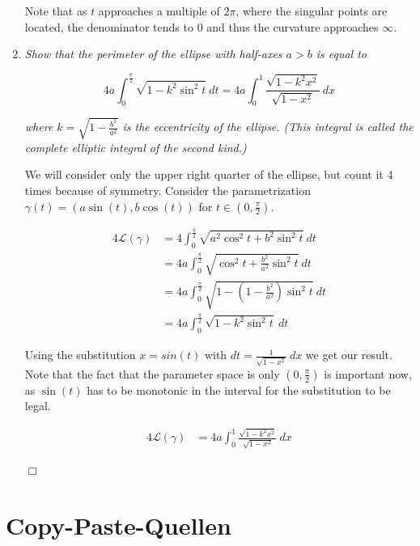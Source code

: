 \documentclass[a4paper,11pt,notitlepage,fullpage]{paper}
\theoremstyle{plain}
\theoremstyle{definition}
\begin{document}
\begin{enumerate}
Note that as $t$ approaches a multiple of $2\pi$, where the singular points are located, the denominator tends to $0$ and thus the curvature approaches $\infty$.



\item \emph{Show that the perimeter of the ellipse with half-axes $a>b$ is equal to }

\begin{equation*}
4a \int_0^\frac{\pi}{2} \sqrt{1 - k^2 \sin^2t} ~dt = 4a \int_0^1 \frac{\sqrt{1 - k^2 x^2}}{\sqrt{1 - x^2}} ~dx
\end{equation*}

\emph{where $k = \sqrt{1 - \frac{b^2}{a^2}}$ is the eccentricity of the ellipse. (This integral is called the complete elliptic integral of the second kind.)}

We will consider only the upper right quarter of the ellipse, but count it 4 times because of symmetry. Consider the parametrization $\gamma(t) = (a \sin(t), b \cos(t))$ for $t \in (0, \frac{\pi}{2})$.

\begin{align*}
4 \mathcal L(\gamma) &= 4 \int_0^\frac{\pi}{2} \sqrt{a^2 \cos^2t + b^2\sin^2t} ~dt \\
&= 4a \int_0^\frac{\pi}{2} \sqrt{\cos^2t + \frac{b^2}{a^2}\sin^2t} ~dt \\
&= 4a \int_0^\frac{\pi}{2} \sqrt{1 - \left(1 - \frac{b^2}{a^2}\right)\sin^2t} ~dt \\
&= 4a \int_0^\frac{\pi}{2} \sqrt{1 - k^2 \sin^2t} ~dt 
\end{align*}

Using the substitution $x = sin(t)$ with $dt = \frac{1}{\sqrt{1-x^2}} ~dx$ we get our result. Note that the fact that the parameter space is only $(0, \frac{\pi}{2})$ is important now, as $\sin(t)$ has to be monotonic in the interval for the substitution to be legal. 

\begin{align*}
4 \mathcal L(\gamma) &= 4a \int_0^1 \frac{\sqrt{1 - k^2 x^2}}{\sqrt{1 - x^2}} ~dx
\end{align*}

\hfill $\Box$

\end{enumerate}

\section{Copy-Paste-Quellen}
\end{document}
